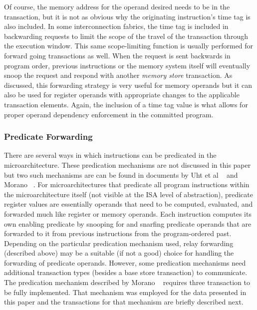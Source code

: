 \documentclass[10pt,twocolumn]{article}
\begin{document}
%
Of course, the memory address for the operand desired
needs to be in the transaction, but it is not as obvious why
the originating instruction's time tag is also included.  In some
interconnection fabrics, the time tag is included in backwarding
requests to limit the scope of the travel of the transaction
through the execution window.  This same scope-limiting function
is usually performed for forward going transactions as well.
When the request is sent backwards in program order, previous
instructions or the memory system itself will eventually snoop
the request and respond with another \textit{memory store}
transaction.
As discussed, this forwarding strategy is very useful for memory
operands but it can also be used for register operands with
appropriate changes to the applicable transaction elements.
Again, the inclusion of a time tag value is what allows
for proper operand dependency enforcement
in the committed program.
%
%
\vspace{-0.25in}
\subsubsection{Predicate Forwarding}
\vspace{-0.15in}
%
There are several ways in which instructions can be predicated
in the microarchitecture.  
These predication mechanisms are not discussed in
this paper but two such mechanisms are can be found in
documents by Uht et al ~\cite{Uht01} and Morano ~\cite{Morano02}.
For microarchitectures that predicate all program instructions
within the microarchitecture itself (not visible at the ISA
level of abstraction), predicate register values are essentially
operands that need to be computed, evaluated, and forwarded
much like register or memory operands.
Each instruction computes its own enabling predicate by
snooping for and snarfing predicate operands that are forwarded
to it from previous instructions from the program-ordered past.
Depending on the particular predication mechanism used,
relay forwarding (described above) may be a suitable (if not a good) choice 
for handling the forwarding of predicate operands.
However, some predication mechanisms need additional transaction
types (besides a base store transaction) to communicate.
The predication mechanism described by Morano ~\cite{Morano02}
requires three transaction to be fully implemented.
That mechanism was employed for the data presented in this paper 
and the transactions for that mechanism
are briefly described next.
\end{document}

